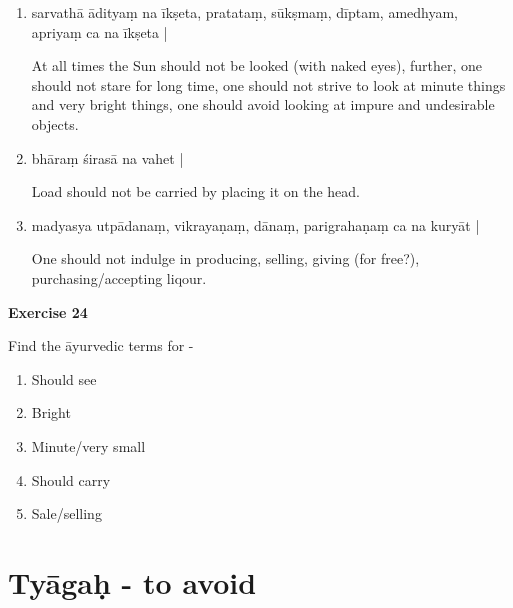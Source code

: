 \begin{enumerate}
\item {}

sarvathā ādityaṃ na īkṣeta, pratataṃ, sūkṣmaṃ, dīptam, amedhyam, apriyaṃ ca na īkṣeta |  

At all times the Sun should not be looked (with naked eyes), further, one should not stare for long time, one should not strive to look at minute things and very bright things, one should avoid looking at impure and undesirable objects.  

\item {}

bhāraṃ śirasā na vahet |

Load should not be carried by placing it on the head.  

\item {}

madyasya utpādanaṃ, vikrayaṇaṃ, dānaṃ, parigrahaṇaṃ ca na kuryāt |   

One should not indulge in producing, selling, giving (for free?), purchasing/accepting liqour.
\end{enumerate}

\begin{center}
\textbf{\large Exercise 24}
\end{center}

Find the āyurvedic terms for -
\begin{enumerate}
\renewcommand{\theenumi}{\alph{enumi}}
\renewcommand{\labelenumi}{\theenumi.}
\item Should see
\item Bright
\item Minute/very small
\item Should carry
\item Sale/selling
\end{enumerate}

\chapter{Tyāgaḥ - to avoid}

